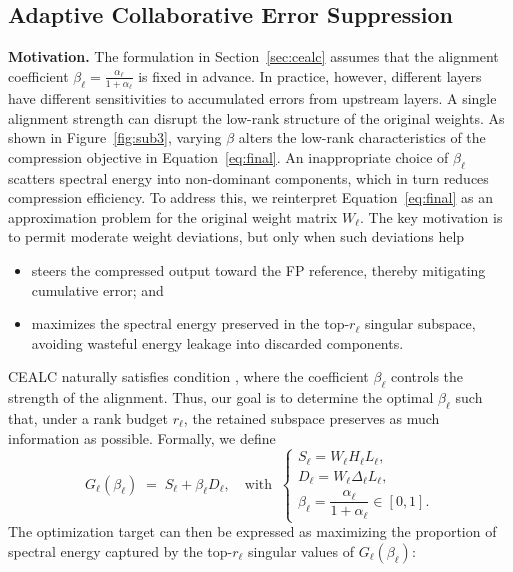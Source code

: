 \subsection{Adaptive Collaborative Error Suppression}\label{sec:adaptive error supression}
\textbf{Motivation.} 
The formulation in Section~\ref{sec:cealc} assumes that the alignment coefficient $\beta_\ell=\frac{\alpha_\ell}{1+\alpha_\ell}$ is fixed in advance. In practice, however, different layers have different sensitivities to accumulated errors from upstream layers. A single alignment strength can disrupt the low-rank structure of the original weights. As shown in Figure~\ref{fig:sub3}, varying $\beta$ alters the low-rank characteristics of the compression objective in Equation~\ref{eq:final}. An inappropriate choice of $\beta_\ell$ scatters spectral energy into non-dominant components, which in turn reduces compression efficiency.
To address this, we reinterpret Equation~\ref{eq:final} as an approximation problem for the original weight matrix $W_\ell$.
The key motivation is to permit moderate weight deviations, but only when such deviations help

\setlength{\leftmargini}{10pt}
\begin{itemize}
    \item {} steers the compressed output toward the FP reference, thereby mitigating cumulative error; and 
    \item {} maximizes the spectral energy preserved in the top-$r_\ell$ singular subspace, avoiding wasteful energy leakage into discarded components.
\end{itemize}
CEALC naturally satisfies condition , where the coefficient $\beta_\ell$ controls the strength of the alignment. Thus, our goal is to determine the optimal $\beta_\ell$ such that, under a rank budget $r_\ell$, the retained subspace preserves as much information as possible. Formally, we define
\begin{equation}
   G_\ell(\beta_\ell) \;=\; S_\ell + \beta_\ell D_\ell,
   \quad 
   \text{with}\;\;
   \begin{cases}
      S_\ell = W_{\ell} H_{\ell} L_{\ell}, \\
      D_\ell = W_{\ell} \Delta_{\ell} L_{\ell}, \\
      \beta_\ell = \dfrac{\alpha_\ell}{1+\alpha_\ell} \in [0,1].
   \end{cases}
\end{equation}
The optimization target can then be expressed as maximizing the proportion of spectral energy captured by the top-$r_\ell$ singular values of $G_\ell(\beta_\ell)$:
